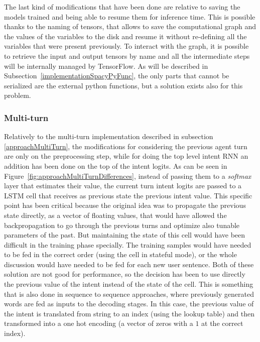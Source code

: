 The last kind of modifications that have been done are relative to saving the models trained and being able to resume them for inference time. This is possible thanks to the naming of tensors, that allows to save the computational graph and the values of the variables to the disk and resume it without re-defining all the variables that were present previously. To interact with the graph, it is possible to retrieve the input and output tensors by name and all the intermediate steps will be internally managed by TensorFlow. As will be described in Subsection~\ref{implementationSpacyPyFunc}, the only parts that cannot be serialized are the external python functions, but a solution exists also for this problem.

\subsubsection{Multi-turn}
Relatively to the multi-turn implementation described in subsection \ref{approachMultiTurn}, the modifications for considering the previous agent turn are only on the preprocessing step, while for doing the top level intent RNN an addition has been done on the top of the intent logits. As can be seen in Figure~\ref{fig:approachMultiTurnDifferences}, instead of passing them to a \textit{softmax} layer that estimates their value, the current turn intent logits are passed to a LSTM cell that receives as previous state the previous intent value. This specific point has been critical because the original idea was to propagate the previous state directly, as a vector of floating values, that would have allowed the backpropagation to go through the previous turns and optimize also tunable parameters of the past. But maintaining the state of this cell would have been difficult in the training phase specially. The training samples would have needed to be fed in the correct order (using the cell in stateful mode), or the whole discussion would have needed to be fed for each new user sentence. Both of these solution are not good for performance, so the decision has been to use directly the previous value of the intent instead of the state of the cell. This is something that is also done in sequence to sequence approaches, where previously generated words are fed as inputs to the decoding stages. In this case, the previous value of the intent is translated from string to an index (using the lookup table) and then transformed into a one hot encoding (a vector of zeros with a $1$ at the correct index).

